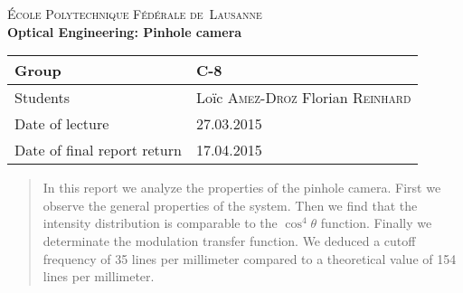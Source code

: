 \begin{titlepage}
\begin{center}
    \textsc{\LARGE École Polytechnique Fédérale de~Lausanne}\\[1.5cm] 
    {\huge \bfseries Optical Engineering: Pinhole camera}\\[0.4cm] 
    \begin{tabular}{|p{5cm}|p{4cm}|}
        \hline
        Group & C-8 \\ \hline
        Students & Loïc \textsc{Amez-Droz} \newline Florian \textsc{Reinhard} \\ \hline
        Date of lecture & 27.03.2015 \\ \hline
        Date of final report return & 17.04.2015 \\ \hline
    \end{tabular}
\end{center}


\begin{abstract}
    In this report we analyze the properties of the pinhole camera.
    First we observe the general properties of the system.
    Then we find that the intensity distribution is comparable to the $\cos^4 \theta$ function.
    Finally we determinate the modulation transfer function.
    We deduced a cutoff frequency of 35 lines per millimeter compared to a theoretical value of 154 lines per millimeter.
\end{abstract}
 
\vfill
\end{titlepage}
